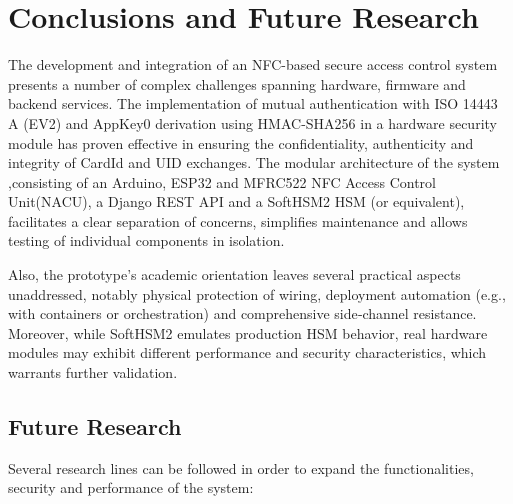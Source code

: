 \chapter{Conclusions and Future Research}
\label{chap:conclusions}
The development and integration of an NFC-based secure access control system presents a number of complex challenges spanning hardware, firmware and backend services. The implementation of mutual authentication with ISO 14443 A (EV2) and AppKey0 derivation using HMAC-SHA256 in a hardware security module has proven effective in ensuring the confidentiality, authenticity and integrity of CardId and UID exchanges. The modular architecture of the system ,consisting of an Arduino, ESP32 and MFRC522 NFC Access Control Unit(NACU), a Django REST API and a SoftHSM2 HSM (or equivalent), facilitates a clear separation of concerns, simplifies maintenance and allows testing of individual components in isolation. 

Also, the prototype’s academic orientation leaves several practical aspects unaddressed, notably physical protection of wiring, deployment automation (e.g., with containers or orchestration) and comprehensive side‑channel resistance. Moreover, while SoftHSM2 emulates production HSM behavior, real hardware modules may exhibit different performance and security characteristics, which warrants further validation.

\section{Future Research}
\label{sec:future_research}
Several research lines can be followed in order to expand the functionalities, security and performance of the system:

